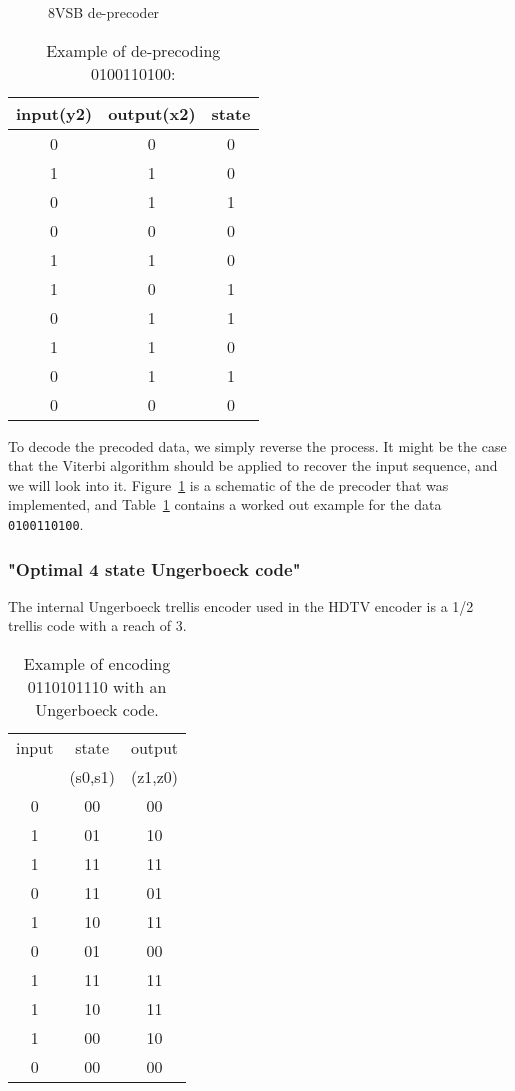 \documentclass{article}
\begin{document}
\begin{figure}
\center
\epsfxsize=3.5in
\caption{8VSB de-precoder}
\label{fig:deprecoder}
\end{figure}

\begin{table}
\center
\begin{tabular}{c|c|c}
input(y2) & output(x2) & state  \\
\hline
0 & 0 & 0 \\
1 & 1 & 0 \\
0 & 1 & 1 \\
0 & 0 & 0 \\
1 & 1 & 0 \\
1 & 0 & 1 \\
0 & 1 & 1 \\
1 & 1 & 0 \\
0 & 1 & 1 \\
0 & 0 & 0 \\
\end{tabular}
\caption{Example of de-precoding 0100110100:}
\label{tbl:de_precoding_example}
\end{table}

To decode the precoded data, we simply reverse the process. It might be the case that 
the Viterbi algorithm should be applied to recover the input sequence, and we will
look into it. Figure~\ref{fig:deprecoder} is a schematic of the de precoder that was
implemented, and Table~\ref{tbl:de_precoding_example} contains a worked out example 
for the data \texttt{0100110100}.


\subsubsection{"Optimal 4 state Ungerboeck code"}
The internal Ungerboeck trellis encoder used in the HDTV encoder is
a 1/2 trellis code with a reach of 3. 

\begin{table}
\center
\begin{tabular}{c|c|c}
input & state   & output  \\
      & (s0,s1) & (z1,z0) \\
\hline
0 & 00 & 00 \\
1 & 01 & 10 \\
1 & 11 & 11 \\
0 & 11 & 01 \\
1 & 10 & 11 \\
0 & 01 & 00 \\
1 & 11 & 11 \\
1 & 10 & 11 \\
1 & 00 & 10 \\
0 & 00 & 00 \\
\end{tabular}
\caption{Example of encoding 0110101110 with an Ungerboeck code.}
\label{tbl:ungerboeck_example}
\end{table}
\end{document}
